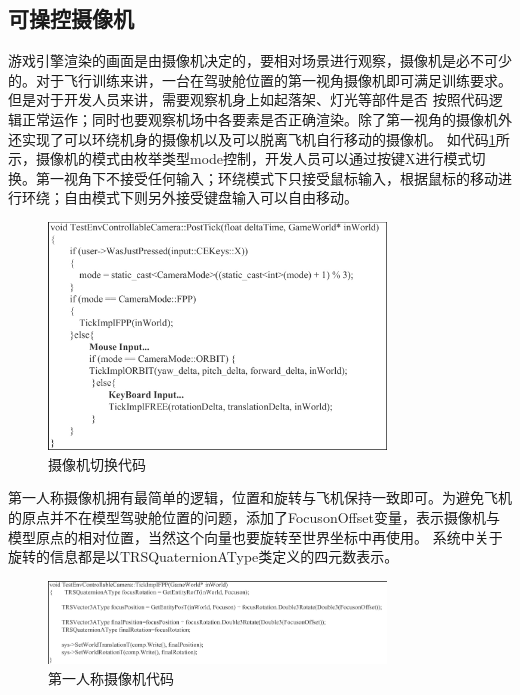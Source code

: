 \subsection{可操控摄像机}
游戏引擎渲染的画面是由摄像机决定的，要相对场景进行观察，摄像机是必不可少的。对于飞行训练来讲，一台在驾驶舱位置的第一视角摄像机即可满足训练要求。但是对于开发人员来讲，需要观察机身上如起落架、灯光等部件是否
按照代码逻辑正常运作；同时也要观察机场中各要素是否正确渲染。除了第一视角的摄像机外还实现了可以环绕机身的摄像机以及可以脱离飞机自行移动的摄像机。
如代码\ref{switchcamera}所示，摄像机的模式由枚举类型mode控制，开发人员可以通过按键X进行模式切换。第一视角下不接受任何输入；环绕模式下只接受鼠标输入，根据鼠标的移动进行环绕；自由模式下则另外接受键盘输入可以自由移动。
\begin{figure}[h!]
    \begin{center}
        \includegraphics[width=0.8\textwidth]{pictures/code27.pdf}
        \caption{摄像机切换代码}
        \label{switchcamera}
    \end{center}
\end{figure}
\par 
第一人称摄像机拥有最简单的逻辑，位置和旋转与飞机保持一致即可。为避免飞机的原点并不在模型驾驶舱位置的问题，添加了FocusonOffset变量，表示摄像机与模型原点的相对位置，当然这个向量也要旋转至世界坐标中再使用。
系统中关于旋转的信息都是以TRSQuaternionAType类定义的四元数表示。
\begin{figure}[h!]
    \begin{center}
        \includegraphics[width=0.8\textwidth]{pictures/code24.pdf}
        \caption{第一人称摄像机代码}
    \end{center}
\end{figure}
